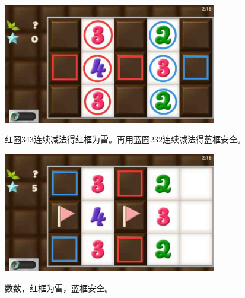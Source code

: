 \subsection{} %
\begin{center}
    \includegraphics[width=0.7\textwidth]{puzzlelow/28-1.jpg}
\end{center}
红圈343连续减法得红框为雷。再用蓝圈232连续减法得蓝框安全。
\begin{center}
    \includegraphics[width=0.7\textwidth]{puzzlelow/28-2.jpg}
\end{center}
数数，红框为雷，蓝框安全。

